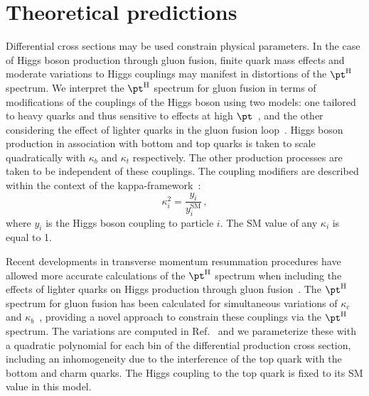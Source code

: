 \section{Theoretical predictions}
\label{sec:theory}



Differential cross sections may be used constrain physical parameters.
% 
In the case of Higgs boson production through gluon fusion, finite quark mass effects and moderate variations to Higgs couplings may manifest in distortions of the $\pth$ spectrum.
% 
We interpret the $\pth$ spectrum for gluon fusion in terms of modifications of the couplings of the Higgs boson using two models: one tailored to heavy quarks and thus sensitive to effects at high $\pt$~\cite{Grazzini:2017szg}, and the other considering the effect of lighter quarks in the gluon fusion loop~\cite{Bishara:2016jga}.
% 
Higgs boson production in association with bottom and top quarks is taken to scale quadratically with $\kappa_b$ and $\kappa_t$ respectively.
% 
The other production processes are taken to be independent of these couplings.
% 
The coupling modifiers are described within the context of the kappa-framework~\cite{LHCHiggsCrossSectionWorkingGroup:2012nn,Khachatryan:2016vau}:
% 
\begin{equation}
    \kappa_i^2
        = \frac{y_i}{y_i^\text{SM}}
    \,,
\end{equation}
% 
% 
where $y_i$ is the Higgs boson coupling to particle $i$.
% 
The SM value of any $\kappa_i$ is equal to 1.


Recent developments in transverse momentum resummation procedures have allowed more accurate calculations of the $\pth$ spectrum when including the effects of lighter quarks on Higgs production through gluon fusion~\cite{Banfi:2013eda,Bozzi:2003jy,Becher:2010tm,Monni:2016ktx}.
% 
The $\pth$ spectrum for gluon fusion has been calculated for simultaneous variations of $\kappa_c$ and $\kappa_b$~\cite{Bishara:2016jga}, providing a novel approach to constrain these couplings via the $\pth$ spectrum.
% 
The variations are computed in Ref.~\cite{Bishara:2016jga} and we parameterize these with a quadratic polynomial for each bin of the differential production cross section, including an inhomogeneity due to the interference of the top quark with the bottom and charm quarks.
% 
The Higgs coupling to the top quark is fixed to its SM value in this model.
% 
% 


